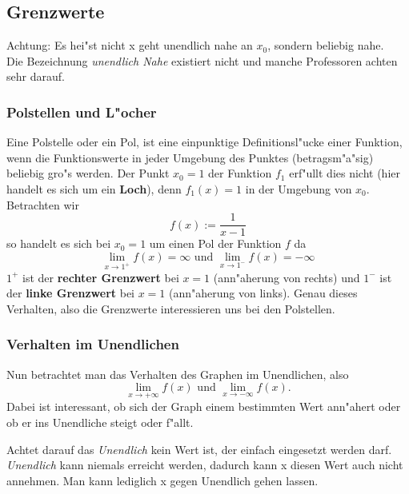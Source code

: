 \subsection{Grenzwerte} \label{sec:grenzwerte}

\begin{warning}
	Achtung: Es hei"st nicht x geht unendlich nahe an $x_0$, sondern beliebig nahe.\\
	Die Bezeichnung \textit{unendlich Nahe} existiert nicht und manche Professoren achten sehr darauf.
\end{warning}

\subsubsection{Polstellen und L"ocher}
Eine Polstelle oder ein Pol, ist eine einpunktige Definitionsl"ucke einer Funktion, wenn die Funktionswerte in jeder Umgebung des Punktes (betragsm"a"sig) beliebig gro"s werden. Der Punkt $x_0 = 1$ der Funktion $f_1$ erf"ullt dies nicht (hier handelt es sich um ein \textbf{Loch}), denn $f_1(x) = 1$ in der Umgebung von $x_0$. Betrachten wir 
\begin{equation*}
f(x) := \frac{1}{x-1}
\end{equation*}
so handelt es sich bei $x_0 = 1$ um einen Pol der Funktion $f$ da
\begin{equation*}
\lim\limits_{x \to 1^+} f(x) = \infty \text{ und } \lim\limits_{x \to 1^-} f(x) = -\infty
\end{equation*}
$1^+$ ist der \textbf{rechter Grenzwert} bei $x=1$ (ann"aherung von rechts) und $1^-$ ist der \textbf{linke Grenzwert} bei $x=1$ (ann"aherung von links). Genau dieses Verhalten, also die Grenzwerte interessieren uns bei den Polstellen.

\subsubsection{Verhalten im Unendlichen}
Nun betrachtet man das Verhalten des Graphen im Unendlichen, also
\begin{equation*}
\lim\limits_{x \to +\infty} f(x) \text{ und } \lim\limits_{x \to -\infty} f(x) .
\end{equation*}
 Dabei ist interessant, ob sich der Graph einem bestimmten Wert ann"ahert oder ob er ins Unendliche steigt oder f"allt.

\begin{warning}
	Achtet darauf das \textit{Unendlich} kein Wert ist, der einfach eingesetzt werden darf. \textit{Unendlich} kann niemals erreicht werden, dadurch kann x diesen Wert auch nicht annehmen. Man kann lediglich x gegen Unendlich gehen lassen.
\end{warning}

